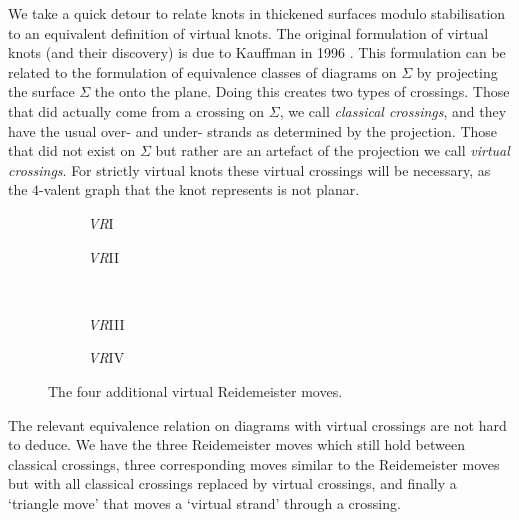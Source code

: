 \documentclass[12pt]{report}
\begin{document}
We take a quick detour to relate knots in thickened surfaces modulo stabilisation to an equivalent definition of virtual knots. The original formulation of virtual knots (and their discovery) is due to Kauffman in 1996 \cite{virtual-knot-theory}. This formulation can be related to the formulation of equivalence classes of diagrams on $\Sigma$ by projecting the surface $\Sigma$ the onto the plane. Doing this creates two types of crossings. Those that did actually come from a crossing on $\Sigma$, we call \textit{classical crossings}, and they have the usual over- and under- strands as determined by the projection. Those that did not exist on $\Sigma$ but rather are an artefact of the projection we call \textit{virtual crossings}. For strictly virtual knots these virtual crossings will be necessary, as the $4$-valent graph that the knot represents is not planar.

\begin{figure}[h!]
	\centering
	\hspace*{\fill}
	\begin{subfigure}[b]{0.35 \textwidth}
		\centering
		\def\svgscale{0.22}
		
		\caption{\textit{VR}I}
	\end{subfigure}
	\hspace*{\fill}
	\begin{subfigure}[b]{0.35 \textwidth}
		\centering
		\def\svgscale{0.22}
		
		\caption{\textit{VR}II}
	\end{subfigure}
	\hspace*{\fill}
	\\
	\hspace*{\fill}
	\begin{subfigure}[b]{0.35 \textwidth}
		\centering
		\def\svgscale{0.22}
		
		\caption{\textit{VR}III}
	\end{subfigure}
	\hspace*{\fill}
	\begin{subfigure}[b]{0.35 \textwidth}
		\centering
		\def\svgscale{0.22}
		
		\caption{\textit{VR}IV}
	\end{subfigure}
	\hspace*{\fill}
	\caption{The four additional virtual Reidemeister moves.}
	\label{fig:virtual-reidemeister-moves}
\end{figure}

The relevant equivalence relation on diagrams with virtual crossings are not hard to deduce. We have the three Reidemeister moves which still hold between classical crossings, three corresponding moves similar to the Reidemeister moves but with all classical crossings replaced by virtual crossings, and finally a `triangle move' that moves a `virtual strand' through a crossing.
\end{document}
